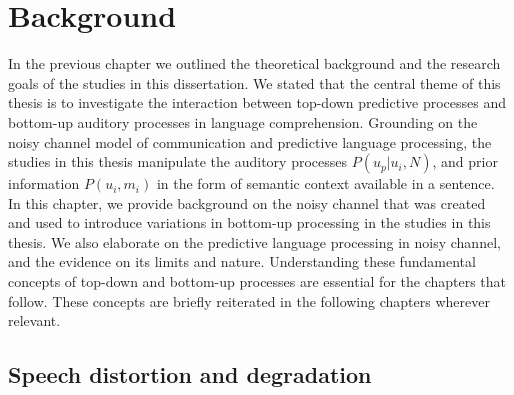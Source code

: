 \documentclass[a4paper, nobind]{templates/ociamthesis}
\begin{document}
\hypertarget{chapter-background}{%
\chapter{Background}\label{chapter-background}}

In the previous chapter we outlined the theoretical background and the research goals of the studies in this dissertation.
We stated that the central theme of this thesis is to investigate the interaction between top-down predictive processes and bottom-up auditory processes in language comprehension.
Grounding on the noisy channel model of communication and predictive language processing,
the studies in this thesis manipulate the auditory processes \(P(u_p|u_i,N)\), and prior information \(P(u_i,m_i)\) in the form of semantic context available in a sentence.
In this chapter, we provide background on the noisy channel that was created and used to introduce variations in bottom-up processing in the studies in this thesis.
We also elaborate on the predictive language processing in noisy channel, and the evidence on its limits and nature.
Understanding these fundamental concepts of top-down and bottom-up processes are essential for the chapters that follow.
These concepts are briefly reiterated in the following chapters wherever relevant.

\hypertarget{distortion-degradation}{%
\section{Speech distortion and degradation}\label{distortion-degradation}}
\end{document}
